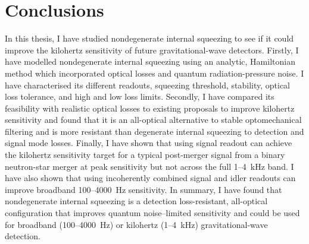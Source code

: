 \chapter{Conclusions}
\label{chp:future_work_and_conclusions}

In this thesis, I have studied nondegenerate internal squeezing to see if it could improve the kilohertz sensitivity of future gravitational-wave detectors.
Firstly, I have modelled nondegenerate internal squeezing using an analytic, Hamiltonian method which incorporated optical losses and quantum radiation-pressure noise. I have characterised its different readouts, squeezing threshold, stability, optical loss tolerance, and high and low loss limits.  Secondly, I have compared its feasibility with realistic optical losses to existing proposals to improve kilohertz sensitivity and found that it is an all-optical alternative to stable optomechanical filtering and is more resistant than degenerate internal squeezing to detection and signal mode losses. %
Finally, I have shown that using signal readout can achieve the kilohertz sensitivity target for a typical post-merger signal from a binary neutron-star merger at peak sensitivity but not across the full 1--4~kHz band. %
I have also shown that using incoherently combined signal and idler readouts can improve broadband 100--4000~Hz  sensitivity. %
In summary, I have found that nondegenerate internal squeezing is a detection loss-resistant, all-optical configuration that improves quantum noise--limited sensitivity and could be used for broadband (100--4000~Hz) or kilohertz (1--4~kHz) gravitational-wave detection.

